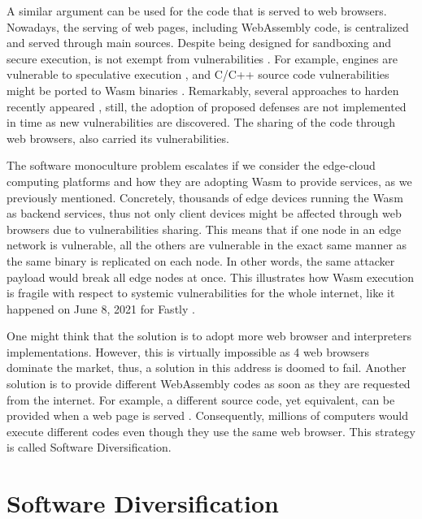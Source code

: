 A similar argument can be used for the \wasm code that is served to web browsers. 
Nowadays, the serving of web pages, including WebAssembly code, is centralized and served through main sources.
Despite being designed for sandboxing and secure execution, \wasm is not exempt from vulnerabilities \cite{WebAssemblySecurity}.
For example, \wasm engines are vulnerable to speculative execution \cite{Narayan2021Swivel}, and C/C++ source code vulnerabilities might be ported to Wasm binaries \cite{DeRoover2022}.  
Remarkably, several approaches to harden \wasm recently appeared \cite{johnson2021}, still, the adoption of proposed defenses are not implemented in time as new vulnerabilities are discovered.
The sharing of the \wasm code through web browsers, also carried its vulnerabilities.


The software monoculture problem escalates if we consider the edge-cloud computing platforms and how they are adopting Wasm to provide services, as we previously mentioned.
Concretely, thousands of edge devices running the Wasm as backend services, thus not only client devices might be affected through web browsers due to vulnerabilities sharing.
This means that if one node in an edge network is vulnerable, all the others are vulnerable in the exact same manner as the same binary is replicated on each node. In other words, the same attacker payload would break all edge nodes at once.
This illustrates how Wasm execution is fragile with respect to systemic vulnerabilities for the whole internet, like it happened on June 8, 2021 for Fastly \cite{BREAKFastly}.

One might think that the solution is to adopt more web browser and interpreters implementations. 
However, this is virtually impossible as 4 web browsers dominate the market, thus, a solution in this address is doomed to fail. 
Another solution is to provide different WebAssembly codes as soon as they are requested from the internet. 
For example, a different source code, yet equivalent, can be provided when a web page is served \cite{CROW}. 
Consequently, millions of computers would execute different codes even though they use the same web browser.
This strategy is called Software Diversification.

\section{Software Diversification}


